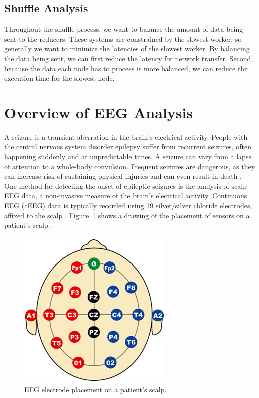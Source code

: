\subsection {Shuffle Analysis}

Throughout the shuffle process, we want to balance the amount of data being sent to the reducers. 
These systems are constrained by the slowest worker, so generally we want to minimize the latencies of the slowest worker.
By balancing the data being sent, we can first reduce the latency for network transfer. Second, because the data each node 
has to process is more balanced, we can reduce the execution time for the slowest node.  

\section{Overview of EEG Analysis}\label{intro-ch:eeg-overview}

A seizure is a transient aberration in the brain's electrical activity. People
with the central nervous system disorder epilepsy suffer from recurrent
seizures, often happening suddenly and at unpredictable times. A seizure can
vary from a lapse of attention to a whole-body convulsion. Frequent seizures
are dangerous, as they can increase risk of sustaining physical injuries and
can even result in death \cite{eeg-ml}. \\

One method for detecting the onset of epileptic seizures is the analysis of
scalp EEG data, a non-invasive measure of the brain's electrical activity.
Continuous EEG (cEEG) data is typically recorded using 19 silver/silver
chloride electrodes, affixed to the scalp \cite{ceeg-1}.
Figure~\ref{fig:electrodes} shows a drawing of the placement of sensors on a
patient's scalp. \\

\begin{figure}[h]
\begin{center}
\includegraphics[scale=0.5]{./img/electrodes.png}
\caption{EEG electrode placement on a patient's scalp.}
\label{fig:electrodes}
\end{center}
\end{figure}

